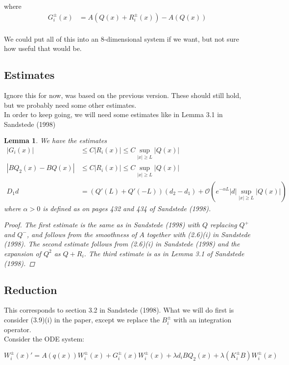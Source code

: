 \documentclass[12pt]{article}
\newtheorem{lemma}{Lemma}
\begin{document}
where
\begin{align*}
G_i^\pm(x) &= A(Q(x) + R_i^\pm(x)) - A(Q(x)) \\
\end{align*}

We could put all of this into an 8-dimensional system if we want, but not sure how useful that would be.


\subsection*{Estimates}
Ignore this for now, was based on the previous version. These should still hold, but we probably need some other estimates. \\

In order to keep going, we will need some estimates like in Lemma 3.1 in Sandstede (1998)

\begin{lemma}We have the estimates
\begin{align*}
|G_i(x)| &\leq C|R_i(x)| \leq C \sup_{|x| \geq L} |Q(x)| \\
| B Q_2(x) - B Q(x) | & \leq C |R_i(x)| \leq C \sup_{|x| \geq L} |Q(x)| \\
D_1 d &= (Q'(L) + Q'(-L))(d_2 - d_1) +\mathcal{O}\left( e^{-\alpha L} |d| \sup_{|x| \geq L} |Q(x)| \right)
\end{align*}
where $\alpha > 0$ is defined as on pages 432 and 434 of Sandstede (1998).
\begin{proof}
The first estimate is the same as in Sandstede (1998) with $Q$ replacing $Q^+$ and $Q^-$, and follows from the smoothness of $A$ together with (2.6)(i) in Sandstede (1998). The second estimate follows from (2.6)(i) in Sandstede (1998) and the expansion of $Q^2$ as $Q + R_i$. The third estimate is as in Lemma 3.1 of Sandstede (1998).
\end{proof}
\end{lemma}

\subsection*{Reduction}
This corresponds to section 3.2 in Sandstede (1998). What we will do first is consider (3.9)(i) in the paper, except we replace the $B_i^\pm$ with an integration operator.\\

Consider the ODE system:

\[
W_i^\pm(x)' = A(q(x)) W_i^\pm(x) + G_i^\pm(x) W_i^\pm(x) + \lambda d_i B Q_2(x) + \lambda (K_i^\pm B )W_i^\pm(x)
\]
\end{document}
